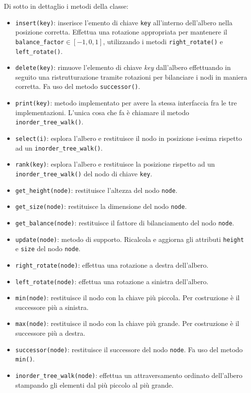 Di sotto in dettaglio i metodi della classe:
\begin{itemize}
	\item \texttt{insert(key)}: inserisce l'emento di chiave \texttt{key} all'interno dell'albero nella posizione corretta. Effettua una rotazione appropriata per mantenere il \texttt{balance\_factor}$\in [-1, 0, 1]$, utilizzando i metodi \texttt{right\_rotate()} e \texttt{left\_rotate()}.
	\item \texttt{delete(key)}: rimuove l'elemento di chiave \textit{key} dall'albero effettuando in seguito una ristrutturazione tramite rotazioni per bilanciare i nodi in maniera corretta. Fa uso del metodo \texttt{successor()}.
	\item \texttt{print(key)}: metodo implementato per avere la stessa interfaccia fra le tre implementazioni. L'unica cosa che fa è chiamare il metodo \texttt{inorder\_tree\_walk()}.
	\item \sloppy \texttt{select(i)}: esplora l'albero e restituisce il nodo in posizione i-esima rispetto ad un \texttt{inorder\_tree\_walk()}.
	\item \texttt{rank(key)}: esplora l'albero e restituisce la posizione rispetto ad un \texttt{inorder\_tree\_walk()} del nodo di chiave \texttt{key}.
	\item \texttt{get\_height(node)}: restituisce l'altezza del nodo \texttt{node}.
	\item \texttt{get\_size(node)}: restituisce la dimensione del nodo \texttt{node}.
	\item \texttt{get\_balance(node)}: restituisce il fattore di bilanciamento del nodo \texttt{node}.
	\item \texttt{update(node)}: metodo di supporto. Ricalcola e aggiorna gli attributi \texttt{height} e \texttt{size} del nodo \texttt{node}.
	\item \texttt{right\_rotate(node)}: effettua una rotazione a destra dell'albero.
	\item \texttt{left\_rotate(node)}: effettua una rotazione a sinistra dell'albero.
	\item \texttt{min(node)}: restituisce il nodo con la chiave più piccola. Per costruzione è il successore più a sinistra.
	\item \texttt{max(node)}: restituisce il nodo con la chiave più grande. Per costruzione è il successore più a destra.
	\item \texttt{successor(node)}: restituisce il successore del nodo \texttt{node}. Fa uso del metodo \texttt{min()}.
	\item \texttt{inorder\_tree\_walk(node)}: effettua un attraversamento ordinato dell'albero stampando gli elementi dal più piccolo al più grande.
\end{itemize}

